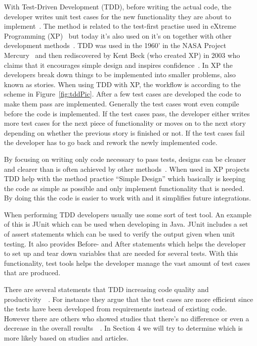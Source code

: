 With Test-Driven Development (TDD), before writing the actual code, the developer writes unit test cases for the new functionality they are about to implement~\cite{beckTestDriven}. The method is related to the test-first practise used in eXtreme Programming (XP)~\cite{beckXP} but today it’s also used on it’s on together with other development methods~\cite{MSNET}. TDD was used in the 1960’ in the NASA Project Mercury~\cite{NASA} and then rediscovered by Kent Beck (who created XP) in 2003 who claims that it encourages simple design and inspires confidence~\cite{beckXP}. In XP the developers break down things to be implemented into smaller problems, also known as stories. When using TDD with XP, the workflow is according to the scheme in Figure~\ref{fig:tddPic}. After a few test cases are developed the code to make them pass are implemented. Generally the test cases wont even compile before the code is implemented. If the test cases pass, the developer either writes more test cases for the next piece of functionality or moves on to the next story depending on whether the previous story is finished or not. If the test cases fail the developer has to go back and rework the newly implemented code.


By focusing on writing only code necessary to pass tests, designs can be cleaner and clearer than is often achieved by other methods~\cite{beckXP}. When used in XP projects TDD help with the method practice “Simple Design” which basically is keeping the code as simple as possible and only implement functionality that is needed. By doing this the code is easier to work with and it simplifies future integrations. 


When performing TDD developers usually use some sort of test tool. An example of this is JUnit which can be used when developing in Java. JUnit includes a set of assert statements which can be used to verify the output given when unit testing. It also provides Before- and After statements which helps the developer to set up and tear down variables that are needed for several tests. With this functionality, test tools helps the developer manage the vast amount of test cases that are produced.


There are several statements that TDD increasing code quality and productivity~\cite{beckXP}~\cite{erdogmus}. For instance they argue that the test cases are more efficient since the tests have been developed from requirements instead of existing code. However there are others who showed studies that there’s no difference or even a decrease in the overall results~\cite{tddInvest}~\cite{mullerandhagner}. In Section 4 we will try to determine which is more likely based on studies and articles.